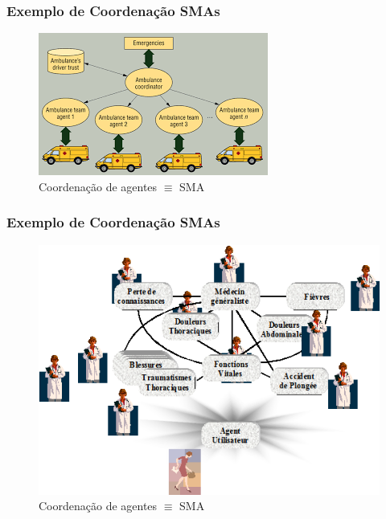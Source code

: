 \documentclass[10pt]{beamer}
\begin{document}
\begin{frame}
\frametitle{Exemplo de Coordenação SMAs}

\begin{figure}[!ht]
\centering
\includegraphics[height =.6\textheight,width=.7\textwidth]{figuras/coordenacao_agentes01.png}
\caption{Coordenação de agentes $\equiv $   SMA}
\end{figure}
 \end{frame}





\begin{frame}
\frametitle{Exemplo de Coordenação SMAs}

\begin{figure}[!ht]
\centering
\includegraphics[height =.6\textheight,width=.7\textwidth]{figuras/coordenacao_agentes02.png}
\caption{Coordenação de agentes $\equiv $   SMA}
\end{figure}
 
\end{frame}
\end{document}
